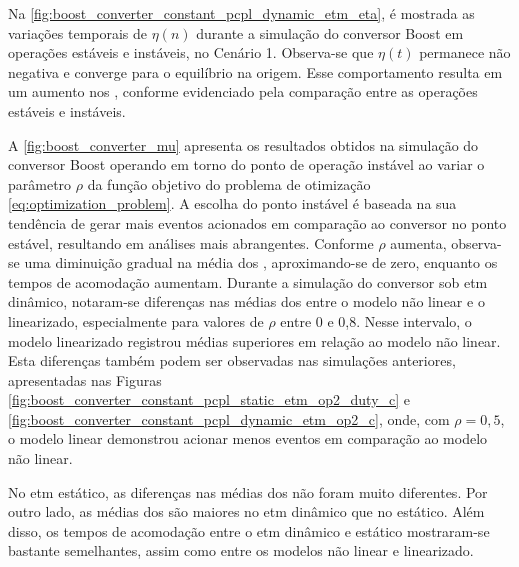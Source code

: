 Na \autoref{fig:boost_converter_constant_pcpl_dynamic_etm_eta}, é mostrada as variações temporais de $\eta(n)$ durante a simulação do conversor Boost em operações estáveis e instáveis, no Cenário 1. Observa-se que $\eta(t)$ permanece não negativa e converge para o equilíbrio na origem. Esse comportamento resulta em um aumento nos , conforme evidenciado pela comparação entre as operações estáveis e instáveis.

A \autoref{fig:boost_converter_mu} apresenta os resultados obtidos na simulação do conversor Boost operando em torno do ponto de operação instável ao variar o parâmetro $\rho$ da função objetivo do problema de otimização \eqref{eq:optimization_problem}. A escolha do ponto instável é baseada na sua tendência de gerar mais eventos acionados em comparação ao conversor no ponto estável, resultando em análises mais abrangentes.  Conforme $\rho$ aumenta, observa-se uma diminuição gradual na média dos , aproximando-se de zero, enquanto os tempos de acomodação aumentam. Durante a simulação do conversor sob \acrshort{etm} dinâmico, notaram-se diferenças nas médias dos  entre o modelo não linear e o linearizado, especialmente para valores de $\rho$ entre 0 e 0,8. Nesse intervalo, o modelo linearizado registrou médias superiores em relação ao modelo não linear. Esta diferenças também podem ser observadas nas simulações anteriores, apresentadas nas Figuras \ref{fig:boost_converter_constant_pcpl_static_etm_op2_duty_c} e \ref{fig:boost_converter_constant_pcpl_dynamic_etm_op2_c}, onde, com $\rho = 0,5$, o modelo linear demonstrou acionar menos eventos em comparação ao modelo não linear. 

No \acrshort{etm} estático, as diferenças nas médias dos  não foram muito diferentes. Por outro lado, as médias dos  são maiores no \acrshort{etm} dinâmico que no estático. Além disso, os tempos de acomodação entre o \acrshort{etm} dinâmico e estático mostraram-se bastante semelhantes, assim como entre os modelos não linear e linearizado.

